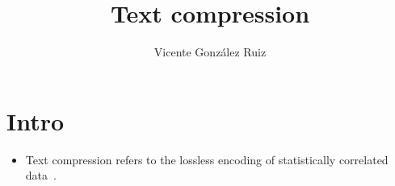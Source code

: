 
\title{Text compression}

\author{Vicente González Ruiz}

\maketitle

\section{Intro}

\begin{itemize}
\item Text compression refers to the lossless encoding of statistically correlated data~\cite{mahoney2012data}.
\end{itemize}


